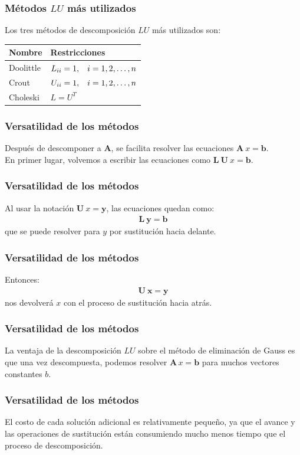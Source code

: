 \documentclass[12pt]{beamer}
\begin{document}
\begin{frame}
\frametitle{Métodos $LU$ más utilizados}
Los tres métodos de descomposición $LU$ más utilizados son:
\pause
\begin{table}[H]
\centering
\begin{tabular}{l | l}
Nombre & Restricciones \\ \hline
Doolittle & $L_{ii} = 1, \hspace{0.3cm} i = 1, 2, \ldots, n$ \\
Crout & $U_{ii} = 1, \hspace{0.3cm} i = 1, 2, \ldots, n$ \\
Choleski & $L = U^{T}$ 
\end{tabular}
\end{table}
\end{frame}
\begin{frame}
\frametitle{Versatilidad de los métodos}
Después de descomponer a $\mathbf{A}$, se facilita resolver las ecuaciones $\mathbf{A} \: x = \mathbf{b}$. 
\\
\bigskip
\pause
En primer lugar, volvemos a escribir las ecuaciones como $\mathbf{L} \: \mathbf{U} \: x = \mathbf{b}$.
\end{frame}
\begin{frame}
\frametitle{Versatilidad de los métodos}
Al usar la notación $\mathbf{U} \: x = \mathbf{y}$, las ecuaciones quedan como:
\pause
\begin{align*}
\mathbf{L \: y = b}
\end{align*}
que se puede resolver para $y$ por sustitución hacia delante. 
\end{frame}
\begin{frame}
\frametitle{Versatilidad de los métodos}
Entonces:
\pause
\begin{align*}
\mathbf{U \: x = y}
\end{align*}
nos devolverá $x$ con el proceso de sustitución hacia atrás.
\end{frame}
\begin{frame}
\frametitle{Versatilidad de los métodos}
La ventaja de la descomposición $LU$ sobre el método de eliminación de Gauss es que una vez descompuesta, podemos resolver $\mathbf{A} \, x = \mathbf{b}$ para muchos vectores constantes $b$.
\end{frame}
\begin{frame}
\frametitle{Versatilidad de los métodos}
El costo de cada solución adicional es relativamente pequeño, ya que el avance y las operaciones de sustitución están consumiendo mucho menos tiempo que el proceso de descomposición.
\end{frame}
\end{document}
